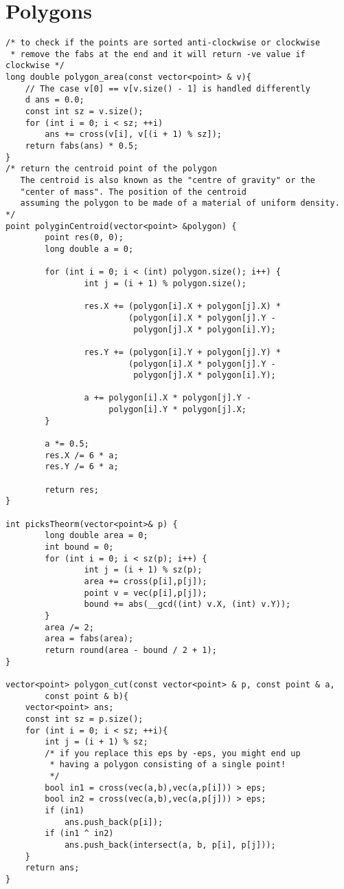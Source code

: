 \documentclass[12pt]{book}
\begin{document}
\section{Polygons}
\begin{verbatim}
/* to check if the points are sorted anti-clockwise or clockwise
 * remove the fabs at the end and it will return -ve value if clockwise */
long double polygon_area(const vector<point> & v){
	// The case v[0] == v[v.size() - 1] is handled differently
	d ans = 0.0;
	const int sz = v.size();
	for (int i = 0; i < sz; ++i)
		ans += cross(v[i], v[(i + 1) % sz]);
	return fabs(ans) * 0.5;
}
/* return the centroid point of the polygon
   The centroid is also known as the "centre of gravity" or the
   "center of mass". The position of the centroid
   assuming the polygon to be made of a material of uniform density. */
point polyginCentroid(vector<point> &polygon) {
        point res(0, 0);
        long double a = 0;

        for (int i = 0; i < (int) polygon.size(); i++) {
                int j = (i + 1) % polygon.size();

                res.X += (polygon[i].X + polygon[j].X) *
                         (polygon[i].X * polygon[j].Y -
                          polygon[j].X * polygon[i].Y);

                res.Y += (polygon[i].Y + polygon[j].Y) *
                         (polygon[i].X * polygon[j].Y -
                          polygon[j].X * polygon[i].Y);

                a += polygon[i].X * polygon[j].Y -
                     polygon[i].Y * polygon[j].X;
        }

        a *= 0.5;
        res.X /= 6 * a;
        res.Y /= 6 * a;

        return res;
}

int picksTheorm(vector<point>& p) {
        long double area = 0;
        int bound = 0;
        for (int i = 0; i < sz(p); i++) {
                int j = (i + 1) % sz(p);
                area += cross(p[i],p[j]);
                point v = vec(p[i],p[j]);
                bound += abs(__gcd((int) v.X, (int) v.Y));
        }
        area /= 2;
        area = fabs(area);
        return round(area - bound / 2 + 1);
}

vector<point> polygon_cut(const vector<point> & p, const point & a,
		const point & b){
	vector<point> ans;
	const int sz = p.size();
	for (int i = 0; i < sz; ++i){
		int j = (i + 1) % sz;
		/* if you replace this eps by -eps, you might end up
		 * having a polygon consisting of a single point!
		 */
		bool in1 = cross(vec(a,b),vec(a,p[i])) > eps;
		bool in2 = cross(vec(a,b),vec(a,p[j])) > eps;
		if (in1)
			ans.push_back(p[i]);
		if (in1 ^ in2)
			ans.push_back(intersect(a, b, p[i], p[j]));
	}
	return ans;
}


\end{verbatim}
\end{document}
